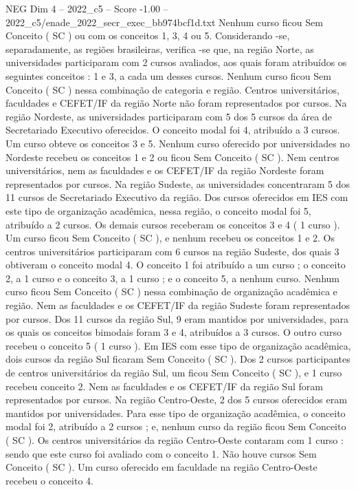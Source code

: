 \begin{textsample}{NEG Dim 4 – 2022\_c5 – Score -1.00 – 2022\_c5/enade\_2022\_secr\_exec\_bb974bcf1d.txt}
Nenhum curso ficou Sem Conceito ( SC ) ou com os conceitos 1, 3, 4 ou 5.
Considerando -se, separadamente, as regiões brasileiras, verifica -se que, na região Norte, as universidades participaram com 2 cursos avaliados, aos quais foram atribuídos os seguintes conceitos : 1 e 3, a cada um desses cursos.
Nenhum curso ficou Sem Conceito ( SC ) nessa combinação de categoria e região.
Centros universitários, faculdades e CEFET/IF da região Norte não foram representados por cursos.
Na região Nordeste, as universidades participaram com 5 dos 5 cursos da área de Secretariado Executivo oferecidos.
O conceito modal foi 4, atribuído a 3 cursos.
Um curso obteve os conceitos 3 e 5.
Nenhum curso oferecido por universidades no Nordeste recebeu os conceitos 1 e 2 ou ficou Sem Conceito ( SC ).
Nem centros universitários, nem as faculdades e os CEFET/IF da região Nordeste foram representados por cursos.
Na região Sudeste, as universidades concentraram 5 dos 11 cursos de Secretariado Executivo da região.
Dos cursos oferecidos em IES com este tipo de organização acadêmica, nessa região, o conceito modal foi 5, atribuído a 2 cursos.
Os demais cursos receberam os conceitos 3 e 4 ( 1 curso ).
Um curso ficou Sem Conceito ( SC ), e nenhum recebeu os conceitos 1 e 2.
Os centros universitários participaram com 6 cursos na região Sudeste, dos quais 3 obtiveram o conceito modal 4.
O conceito 1 foi atribuído a um curso ; o conceito 2, a 1 curso e o conceito 3, a 1 curso ; e o conceito 5, a nenhum curso.
Nenhum curso ficou Sem Conceito ( SC ) nessa combinação de organização acadêmica e região.
Nem as faculdades e os CEFET/IF da região Sudeste foram representados por cursos.
Dos 11 cursos da região Sul, 9 eram mantidos por universidades, para os quais os conceitos bimodais foram 3 e 4, atribuídos a 3 cursos.
O outro curso recebeu o conceito 5 ( 1 curso ).
Em IES com esse tipo de organização acadêmica, dois cursos da região Sul ficaram Sem Conceito ( SC ).
Dos 2 cursos participantes de centros universitários da região Sul, um ficou Sem Conceito ( SC ), e 1 curso recebeu conceito 2.
Nem as faculdades e os CEFET/IF da região Sul foram representados por cursos.
Na região Centro-Oeste, 2 dos 5 cursos oferecidos eram mantidos por universidades.
Para esse tipo de organização acadêmica, o conceito modal foi 2, atribuído a 2 cursos ; e, nenhum curso da região ficou Sem Conceito ( SC ).
Os centros universitários da região Centro-Oeste contaram com 1 curso : sendo que este curso foi avaliado com o conceito 1.
Não houve cursos Sem Conceito ( SC ).
Um curso oferecido em faculdade na região Centro-Oeste recebeu o conceito 4.

\end{textsample}
